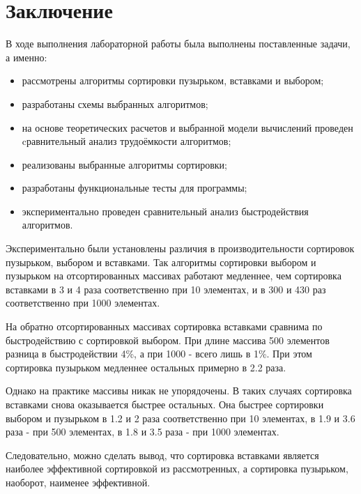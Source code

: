 \chapter*{Заключение}

В ходе выполнения лабораторной работы была выполнены поставленные задачи, а именно:

\begin{itemize}
	\item рассмотрены алгоритмы сортировки пузырьком, вставками и выбором;
	\item разработаны схемы выбранных алгоритмов;
	\item на основе теоретических расчетов и выбранной модели вычислений 
	проведен cравнительный анализ трудоёмкости алгоритмов;
	\item реализованы выбранные алгоритмы сортировки;
	\item разработаны функциональные тесты для программы;
	\item экспериментально проведен сравнительный анализ быстродействия алгоритмов.
\end{itemize}


Экспериментально были установлены различия в производительности сортировок пузырьком, выбором
и вставками. Так алгоритмы сортировки выбором и пузырьком на отсортированных массивах работают 
медленнее, чем сортировка вставками в 3 и 4 раза соответственно при 10 элементах, и в 300 и 430 раз
соответственно при 1000 элементах.

На обратно отсортированных массивах сортировка вставками сравнима по быстродействию с сортировкой выбором.
При длине массива 500 элементов разница в быстродействии 4\%, а при 1000 - всего лишь в 1\%. При этом 
сортировка пузырьком медленнее остальных примерно в 2.2 раза.

Однако на практике массивы никак не упорядочены. В таких случаях сортировка вставками снова оказывается 
быстрее остальных. Она быстрее сортировки выбором и пузырьком в 1.2 и 2 раза соответственно при 10 
элементах, в 1.9 и 3.6 раза - при 500 элементах, в 1.8 и 3.5 раза - при 1000 элементах.

Следовательно, можно сделать вывод, что сортировка вставками является наиболее эффективной сортировкой 
из рассмотренных, а сортировка пузырьком, наоборот, наименее эффективной.
